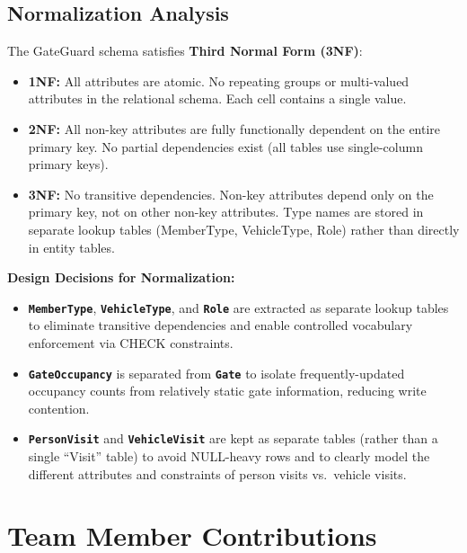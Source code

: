 \documentclass[a4paper, 12pt]{article}
\newcommand{\entityname}[1]{\texttt{\textbf{#1}}}
\begin{document}
\subsection{Normalization Analysis}

The GateGuard schema satisfies \textbf{Third Normal Form (3NF)}:

\begin{itemize}[leftmargin=*, nosep]
    \item \textbf{1NF:} All attributes are atomic. No repeating groups or multi-valued attributes in the relational schema. Each cell contains a single value.
    \item \textbf{2NF:} All non-key attributes are fully functionally dependent on the entire primary key. No partial dependencies exist (all tables use single-column primary keys).
    \item \textbf{3NF:} No transitive dependencies. Non-key attributes depend only on the primary key, not on other non-key attributes. Type names are stored in separate lookup tables (MemberType, VehicleType, Role) rather than directly in entity tables.
\end{itemize}

\textbf{Design Decisions for Normalization:}
\begin{itemize}[leftmargin=*, nosep]
    \item \entityname{MemberType}, \entityname{VehicleType}, and \entityname{Role} are extracted as separate lookup tables to eliminate transitive dependencies and enable controlled vocabulary enforcement via CHECK constraints.
    \item \entityname{GateOccupancy} is separated from \entityname{Gate} to isolate frequently-updated occupancy counts from relatively static gate information, reducing write contention.
    \item \entityname{PersonVisit} and \entityname{VehicleVisit} are kept as separate tables (rather than a single ``Visit'' table) to avoid NULL-heavy rows and to clearly model the different attributes and constraints of person visits vs.\ vehicle visits.
\end{itemize}

\newpage
\section{Team Member Contributions}
\label{sec:contributions}
\end{document}
